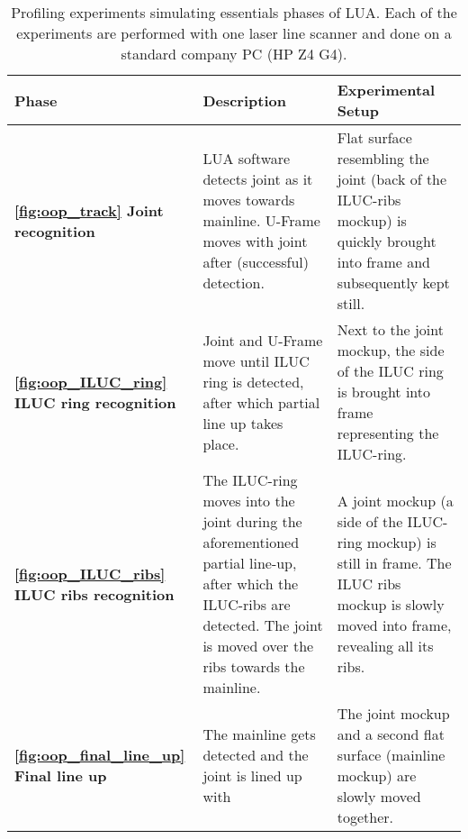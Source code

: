 \begin{table}[H]
    \centering
    \begin{tabular}{|p{4cm}|p{5.5cm}|p{5cm}|}
        \hline
        \textbf{Phase}& \textbf{Description} & \textbf{Experimental Setup} \\ \hline

        \textbf{\ref{fig:oop_track} Joint recognition} & LUA software detects joint as it moves towards mainline. U-Frame moves with joint after (successful) detection. & Flat surface resembling the joint (back of the ILUC-ribs mockup) is quickly brought into frame and subsequently kept still.\\ \hline

        \textbf{\ref{fig:oop_ILUC_ring} ILUC ring recognition} & Joint and U-Frame move until ILUC ring is detected, after which partial line up takes place. & Next to the joint mockup, the side of the ILUC ring is brought into frame representing the ILUC-ring.\\ \hline

        \textbf{\ref{fig:oop_ILUC_ribs} ILUC ribs recognition} & The ILUC-ring moves into the joint during the aforementioned partial line-up, after which the ILUC-ribs are detected. The joint is moved over the ribs towards the mainline. & A joint mockup (a side of the ILUC-ring mockup) is still in frame. The ILUC ribs mockup is slowly moved into frame, revealing all its ribs. \\ \hline

        \textbf{\ref{fig:oop_final_line_up} Final line up}  & The mainline gets detected and the joint is lined up with & The joint mockup and a second flat surface (mainline mockup) are slowly moved together. \\ \hline
    \end{tabular}
    \caption{Profiling experiments simulating essentials phases of LUA. Each of the experiments are performed with one laser line scanner and done on a standard company PC (HP Z4 G4).}
    \label{tab:experimental_phases}
\end{table}